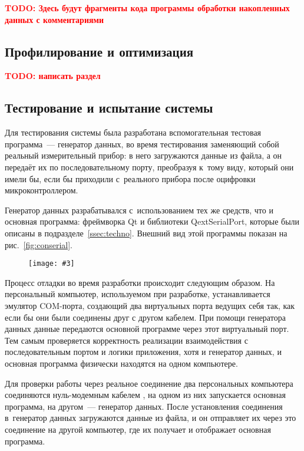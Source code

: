 \documentclass[a4paper, 14pt, titlepage]{extarticle}
\newcommand{\todo}[1]{\textbf{\textcolor{red}{TODO: #1}}}
\newenvironment{myfigure}[2]%
    {\pushQED{\caption{#1} \label{#2}} %
     \begin{figure}[!htb]\centering } %
    {  \popQED %
     \end{figure}}
\newcommand{\includefigure}[3][]{
    \begin{myfigure}{#2}{fig:#3}
      \texttt{[image: \#3]}
    \end{myfigure}
  }
\begin{document}
  \todo{Здесь будут фрагменты кода программы обработки накопленных данных с комментариями}

  \subsection{Профилирование и оптимизация}

  \todo{написать раздел}

  \subsection{Тестирование и испытание системы}\label{ssec:testing}

  Для тестирования системы была разработана вспомогательная тестовая программа~--- генератор данных,
  во время тестирования заменяющий собой реальный измерительный прибор: в него загружаются данные из
  файла, а он передаёт их по последовательному порту, преобразуя к~тому виду, который они имели бы,
  если бы приходили с~реального прибора после оцифровки микроконтроллером.

  Генератор данных разрабатывался с~использованием тех же средств, что и основная программа:
  фреймворка Qt и библиотеки QextSerialPort, которые были описаны в подразделе~\ref{ssec:techno}.
  Внешний вид этой программы показан на рис.~\ref{fig:conserial}.

  \includefigure[width=0.4\textwidth]{Тестовая программа~--- генератор данных}{conserial}

  Процесс отладки во время разработки происходит следующим образом. На персональный компьютер,
  используемом при разработке, устанавливается эмулятор COM-порта, создающий два виртуальных порта
  ведущих себя так, как если бы они были соединены друг с другом кабелем. При помощи генератора
  данных данные передаются основной программе через этот виртуальный порт. Тем самым проверяется
  корректность реализации взаимодействия с последовательным портом и логики приложения, хотя и
  генератор данных, и основная программа физически находятся на одном компьютере.

  Для проверки работы через реальное соединение два персональных компьютера
  соединяются нуль-модемным кабелем \cite{null-modem}, на одном из них запускается основная
  программа, на другом~--- генератор данных. После установления соединения в~генератор данных
  загружаются данные из файла, и он отправляет их через это соединение на другой компьютер, где их
  получает и отображает основная программа.
\end{document}
